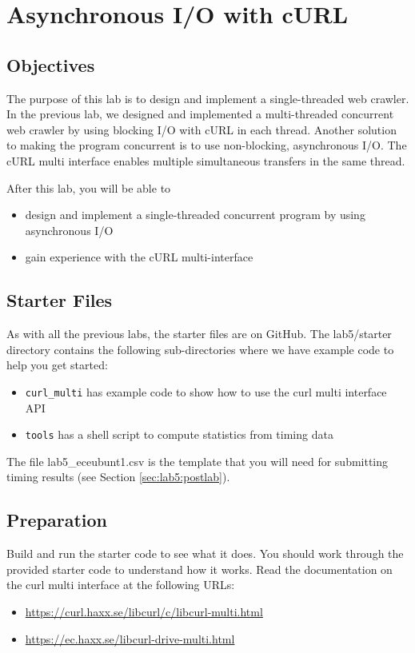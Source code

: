 \chapter{Asynchronous I/O with cURL}

\section{Objectives}
The purpose of this lab is to design and implement a single-threaded web crawler. In the previous lab, we designed and implemented a multi-threaded concurrent web crawler by using blocking I/O with cURL in each thread. Another solution to making the program concurrent is to use non-blocking, asynchronous I/O. The cURL multi interface enables multiple simultaneous transfers in the same thread.


After this lab, you will be able to
\begin{itemize}
\item design and implement a single-threaded concurrent program by using asynchronous I/O
\item gain experience with the cURL multi-interface
\end{itemize}

\section{Starter Files}
As with all the previous labs, the starter files are on GitHub. The lab5/starter directory contains the following sub-directories where we have example code to help you get started:

\begin{itemize}
\item \verb+curl_multi+ has example code to show how to use the curl multi interface API
\item \verb+tools+ has a shell script to compute statistics from timing data
\end{itemize}
The file lab5\_eceubunt1.csv is the template that you will need for submitting timing results (see Section \ref{sec:lab5:postlab}).

\section{Preparation}
Build and run the starter code to see what it does. You should work through the provided starter code to understand how it works. 
Read the documentation on the curl multi interface at the following URLs:
  \begin{itemize}
  \item \url{https://curl.haxx.se/libcurl/c/libcurl-multi.html}
  \item \url{https://ec.haxx.se/libcurl-drive-multi.html}
  \end{itemize}

